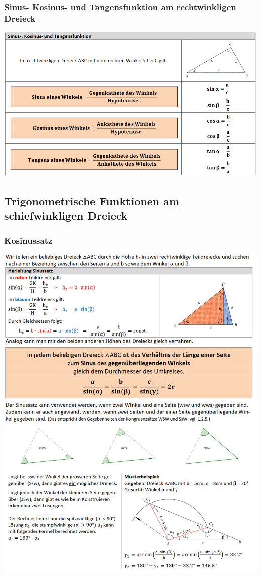 \subsubsection{Sinus- Kosinus- und Tangensfunktion am rechtwinkligen Dreieck}
\includegraphics[scale=0.7]{sinkota.PNG}

\newpage{}


\subsection{Trigonometrische Funktionen am schiefwinkligen Dreieck}
\subsubsection{Kosinussatz}
\includegraphics[scale=0.7]{sinussatz.PNG}
